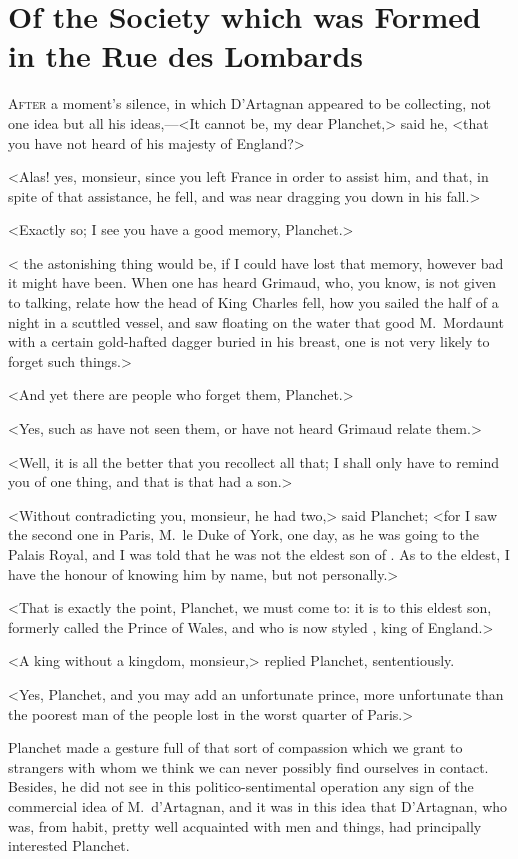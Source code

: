 \chapter{Of the Society which was Formed in the Rue des Lombards}

\lettrine{A}{fter} a moment's silence, in which D'Artagnan appeared to be collecting, not one idea but all his ideas,—<It cannot be, my dear Planchet,> said he, <that you have not heard of his majesty  of England?>

\zz
<Alas! yes, monsieur, since you left France in order to assist him, and that, in spite of that assistance, he fell, and was near dragging you down in his fall.>

<Exactly so; I see you have a good memory, Planchet.>

< the astonishing thing would be, if I could have lost that memory, however bad it might have been. When one has heard Grimaud, who, you know, is not given to talking, relate how the head of King Charles fell, how you sailed the half of a night in a scuttled vessel, and saw floating on the water that good M.~Mordaunt with a certain gold-hafted dagger buried in his breast, one is not very likely to forget such things.>

<And yet there are people who forget them, Planchet.>

<Yes, such as have not seen them, or have not heard Grimaud relate them.>

<Well, it is all the better that you recollect all that; I shall only have to remind you of one thing, and that is that  had a son.>

<Without contradicting you, monsieur, he had two,> said Planchet; <for I saw the second one in Paris, M.~le Duke of York, one day, as he was going to the Palais Royal, and I was told that he was not the eldest son of . As to the eldest, I have the honour of knowing him by name, but not personally.>

<That is exactly the point, Planchet, we must come to: it is to this eldest son, formerly called the Prince of Wales, and who is now styled , king of England.>

<A king without a kingdom, monsieur,> replied Planchet, sententiously.

<Yes, Planchet, and you may add an unfortunate prince, more unfortunate than the poorest man of the people lost in the worst quarter of Paris.>

Planchet made a gesture full of that sort of compassion which we grant to strangers with whom we think we can never possibly find ourselves in contact. Besides, he did not see in this politico-sentimental operation any sign of the commercial idea of M.~d'Artagnan, and it was in this idea that D'Artagnan, who was, from habit, pretty well acquainted with men and things, had principally interested Planchet.

